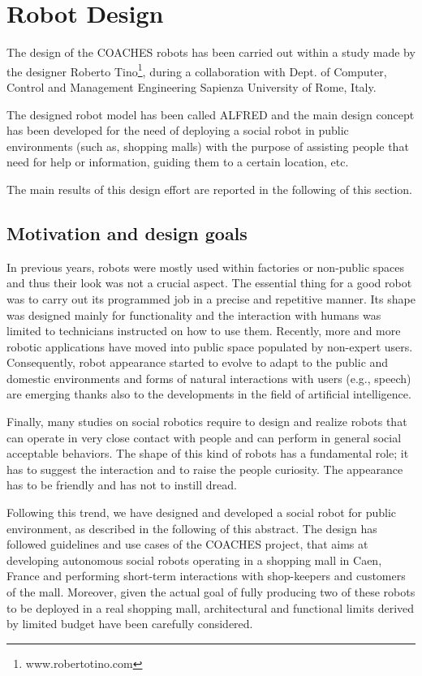 \section{Robot Design}

The design of the COACHES robots has been carried out within a study made by
the designer Roberto Tino\footnote{www.robertotino.com}, during a collaboration
with Dept. of Computer, Control and Management Engineering Sapienza University of Rome, Italy.


The designed robot model has been called ALFRED and the main design concept has been developed for the need of deploying a social robot in public environments (such as, shopping malls) with the purpose of assisting people that need for help or
information, guiding them to a certain location, etc.

The main results of this design effort are reported in the following of this section.


\subsection{Motivation and design goals}

In previous years, robots were mostly used within
factories or non-public spaces and thus their look was not
a crucial aspect. The essential thing for a good robot was
to carry out its programmed job in a precise and
repetitive manner. Its shape was designed mainly for
functionality and the interaction with humans was limited
to technicians instructed on how to use them.
Recently, more and more robotic applications have
moved into public space populated by non-expert users.
Consequently, robot appearance started to evolve to adapt
to the public and domestic environments and forms of
natural interactions with users (e.g., speech) are emerging
thanks also to the developments in the field of artificial
intelligence.

Finally, many studies on social robotics require to design and realize robots that can operate in very close
contact with people and can perform in general social acceptable behaviors. The shape of this kind of robots
has a fundamental role; it has to suggest the interaction and to raise the people curiosity. The appearance has
to be friendly and has not to instill dread.

Following this trend, we have designed and developed a social robot for public environment, as described in
the following of this abstract. The design has followed guidelines and use cases of the COACHES project,
that aims at developing autonomous social robots operating in a shopping mall in Caen, France and
performing short-term interactions with shop-keepers and customers of the mall.
Moreover, given the actual goal of fully producing two of these robots to be deployed in a real shopping
mall, architectural and functional limits derived by limited budget have been carefully considered.

